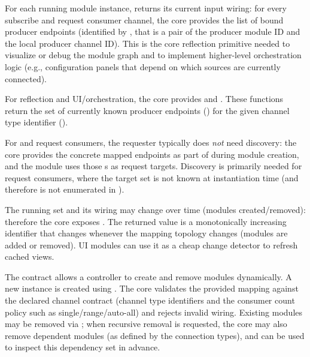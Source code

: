 For each running module instance,  returns its current input wiring: for every subscribe and request consumer channel, the core provides the list of bound producer endpoints (identified by , that is a pair of the producer module ID and the local producer channel ID). This is the core reflection primitive needed to visualize or debug the module graph and to implement higher-level orchestration logic (e.g., configuration panels that depend on which sources are currently connected).

For reflection and UI/orchestration, the core provides
 and
.
These functions return the set of currently known producer endpoints () for the given channel type identifier ().

For  and  request consumers, the requester typically does \emph{not} need discovery: the core provides the concrete mapped endpoints as part of  during module creation, and the module uses those s as request targets.
Discovery is primarily needed for  request consumers, where the target set is not known at instantiation time (and therefore is not enumerated in ).

The running set and its wiring may change over time (modules created/removed): therefore the core exposes . The returned value is a monotonically increasing identifier that changes whenever the mapping topology changes (modules are added or removed). UI modules can use it as a cheap change detector to refresh cached views.

The contract allows a controller to create and remove modules dynamically. A new instance is created using . The core validates the provided mapping against the declared channel contract (channel type identifiers and the consumer count policy such as single/range/auto-all) and rejects invalid wiring. Existing modules may be removed via ; when recursive removal is requested, the core may also remove dependent modules (as defined by the connection types), and  can be used to inspect this dependency set in advance.

